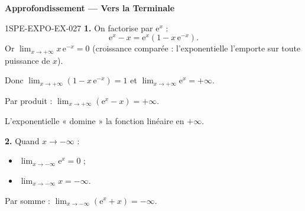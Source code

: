 \begin{center}\textbf{Approfondissement — Vers la Terminale}\end{center}
\begin{corrige}{1SPE-EXPO-EX-027}
\textbf{1.} On factorise par $\mathrm{e}^x$ :
\[\mathrm{e}^x - x = \mathrm{e}^x\left(1 - x\,\mathrm{e}^{-x}\right).\]
Or $\displaystyle\lim_{x \to +\infty} x\,\mathrm{e}^{-x} = 0$ (croissance comparée : l'exponentielle l'emporte sur toute puissance de $x$).

Donc $\displaystyle\lim_{x \to +\infty}\left(1 - x\,\mathrm{e}^{-x}\right) = 1$ et $\displaystyle\lim_{x \to +\infty} \mathrm{e}^x = +\infty$.

Par produit : $\displaystyle\lim_{x \to +\infty} \left(\mathrm{e}^x - x\right) = +\infty$.

L'exponentielle « domine » la fonction linéaire en $+\infty$.

\textbf{2.} Quand $x \to -\infty$ :
\begin{itemize}
  \item $\displaystyle\lim_{x \to -\infty} \mathrm{e}^x = 0$ ;
  \item $\displaystyle\lim_{x \to -\infty} x = -\infty$.
\end{itemize}
Par somme : $\displaystyle\lim_{x \to -\infty} \left(\mathrm{e}^x + x\right) = -\infty$.
\end{corrige}

